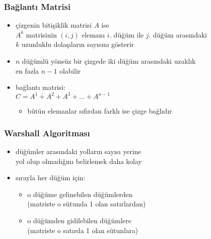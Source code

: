 \documentclass[dvipsnames]{beamer}
\theoremstyle{definition}
\theoremstyle{example}
\theoremstyle{plain}
\begin{document}
\begin{frame}
  \frametitle{Bağlantı Matrisi}

  \begin{itemize}
    \item çizgenin bitişiklik matrisi $A$ ise\\
      $A^k$ matrisinin $(i,j)$ elemanı $i$. düğüm ile $j$. düğüm arasındaki\\
      $k$ uzunluklu dolaşıların sayısını gösterir

    \pause
    \item $n$ düğümlü yönsüz bir çizgede iki düğüm arasındaki uzaklık\\
      en fazla $n-1$ olabilir

    \pause
    \medskip
    \item \alert{bağlantı matrisi}:\\
      $C = A^1 + A^2 + A^3 + \dots + A^{n-1}$
    \begin{itemize}
      \item bütün elemanlar sıfırdan farklı ise çizge bağlıdır
    \end{itemize}
  \end{itemize}
\end{frame}

\begin{frame}
  \frametitle{Warshall Algoritması}

  \begin{itemize}
    \item düğümler arasındaki yolların sayısı yerine\\
      yol olup olmadığını belirlemek daha kolay

    \pause
    \medskip
    \item sırayla her düğüm için:
    \begin{itemize}
      \item o düğüme gelinebilen düğümlerden\\
        (matriste o sütunda 1 olan satırlardan)

      \item o düğümden gidilebilen düğümlere\\
        (matriste o satırda 1 olan sütunlara)
    \end{itemize}
  \end{itemize}
\end{frame}
\end{document}
